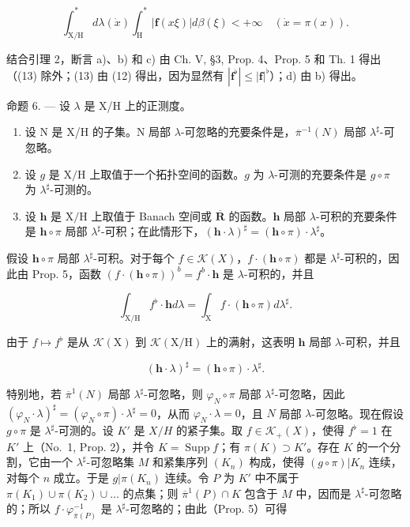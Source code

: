 \[
\int_ {\mathrm{X} / \mathrm{H}} ^ {*} d \lambda (\dot {x}) \int_ {\mathrm{H}} ^ {*} | \mathbf {f} (x \xi) | d \beta (\xi) <   + \infty \quad \left(\dot {x} = \pi (x)\right).
\]

结合引理 2，断言 a)、b) 和 c) 由 Ch. V, §3, Prop. 4、Prop. 5 和 Th. 1 得出（(13) 除外；(13) 由 (12) 得出，因为显然有 \(|\mathbf{f}^{\flat}| \leqslant |\mathbf{f}|^{\flat}\)）；d) 由 b) 得出。

命题 6. --- 设 \(\lambda\) 是 X/H 上的正测度。

\begin{enumerate}
\def\labelenumi{\alph{enumi})}
\item
  设 N 是 X/H 的子集。N 局部 \(\lambda\)-可忽略的充要条件是，\(\overline{\pi}^{-1}(N)\) 局部 \(\lambda^{\sharp}\)-可忽略。
\item
  设 \(g\) 是 \(\mathrm{X / H}\) 上取值于一个拓扑空间的函数。\(g\) 为 \(\lambda\)-可测的充要条件是 \(g \circ \pi\) 为 \(\lambda^{\sharp}\)-可测的。
\item
  设 \(\mathbf{h}\) 是 \(\mathrm{X / H}\) 上取值于 Banach 空间或 \(\overline{\mathbf{R}}\) 的函数。\(\mathbf{h}\) 局部 \(\lambda\)-可积的充要条件是 \(\mathbf{h} \circ \pi\) 局部 \(\lambda^{\sharp}\)-可积；在此情形下，\((\mathbf{h} \cdot \lambda)^{\sharp} = (\mathbf{h} \circ \pi) \cdot \lambda^{\sharp}\)。
\end{enumerate}

假设 \(\mathbf{h} \circ \pi\) 局部 \(\lambda^{\sharp}\)-可积。对于每个 \(f \in \mathcal{K}(X)\)，\(f \cdot (\mathbf{h} \circ \pi)\) 都是 \(\lambda^{\sharp}\)-可积的，因此由 Prop. 5，函数 \((f \cdot (\mathbf{h} \circ \pi))^b = f^b \cdot \mathbf{h}\) 是 \(\lambda\)-可积的，并且

\[
\int_ {\mathrm{X} / \mathrm{H}} f ^ {\flat} \cdot \mathbf {h} d \lambda = \int_ {\mathrm{X}} f \cdot (\mathbf {h} \circ \pi) d \lambda^ {\sharp}.
\]

由于 \(f \mapsto f^{\flat}\) 是从 \(\mathcal{K}(\mathrm{X})\) 到 \(\mathcal{K}(\mathrm{X}/\mathrm{H})\) 上的满射，这表明 \(\mathbf{h}\) 局部 \(\lambda\)-可积，并且

\[
(\mathbf {h} \cdot \lambda) ^ {\sharp} = (\mathbf {h} \circ \pi) \cdot \lambda^ {\sharp}.
\]

特别地，若 \(\overline{\pi}^{1}(N)\) 局部 \(\lambda^{\sharp}\)-可忽略，则 \(\varphi_{N} \circ \pi\) 局部 \(\lambda^{\sharp}\)-可忽略，因此 \((\varphi_{N} \cdot \lambda)^{\sharp} = (\varphi_{N} \circ \pi) \cdot \lambda^{\sharp} = 0\)，从而 \(\varphi_{N} \cdot \lambda = 0\)，且 \(N\) 局部 \(\lambda\)-可忽略。现在假设 \(g \circ \pi\) 是 \(\lambda^{\sharp}\)-可测的。设 \(K'\) 是 \(X/H\) 的紧子集。取 \(f \in \mathcal{K}_{+}(X)\)，使得 \(f^{\flat} = 1\) 在 \(K'\) 上（No.~1, Prop. 2），并令 \(K = \operatorname{Supp} f\)；有 \(\pi(K) \supset K'\)。存在 \(K\) 的一个分割，它由一个 \(\lambda^{\sharp}\)-可忽略集 \(M\) 和紧集序列 \((K_n)\) 构成，使得 \((g \circ \pi)|K_n\) 连续，对每个 \(n\) 成立。于是 \(g|\pi(K_n)\) 连续。令 \(P\) 为 \(K'\) 中不属于 \(\pi(K_1) \cup \pi(K_2) \cup \ldots\) 的点集；则 \(\overline{\pi}^{1}(P) \cap K\) 包含于 \(M\) 中，因而是 \(\lambda^{\sharp}\)-可忽略的；所以 \(f \cdot \varphi_{\overline{\pi}(P)}^{-1}\) 是 \(\lambda^{\sharp}\)-可忽略的；由此（Prop. 5）可得

